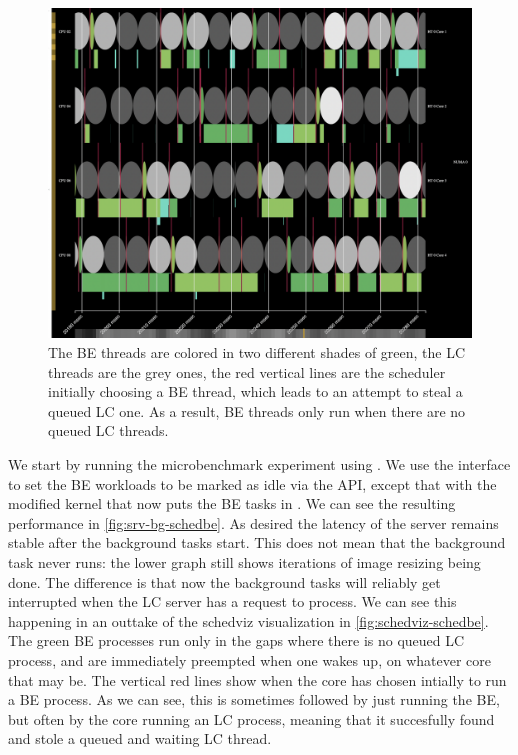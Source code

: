 \begin{figure}[t]
    \centering
    \includegraphics[width=\columnwidth]{graphs/schedviz-schedbe.png}
    \caption{The BE threads are colored in two different shades of green, the LC
    threads are the grey ones, the red vertical lines are the scheduler
    initially choosing a BE thread, which leads to an attempt to steal a queued
    LC one. As a result, BE threads only run when there are no queued LC
    threads.}\label{fig:schedviz-schedbe}
\end{figure}

We start by running the microbenchmark experiment using \schedbe{}. We use the
\cgroups{} interface to set the BE workloads to be marked as idle via the
\cgroups{} API, except that with the modified kernel that now puts the BE tasks
in \schedbe{}. We can see the resulting performance in
\autoref{fig:srv-bg-schedbe}. As desired the latency of the server remains
stable after the background tasks start. This does not mean that the background
task never runs: the lower graph still shows iterations of image resizing being
done. The difference is that now the background tasks will reliably get
interrupted when the LC server has a request to process. We can see this
happening in an outtake of the schedviz visualization in
\autoref{fig:schedviz-schedbe}. The green BE processes run only in the gaps
where there is no queued LC process, and are immediately preempted when one
wakes up, on whatever core that may be. The vertical red lines show when the
core has chosen intially to run a BE process. As we can see, this is sometimes
followed by just running the BE, but often by the core running an LC process,
meaning that it succesfully found and stole a queued and waiting LC thread.

